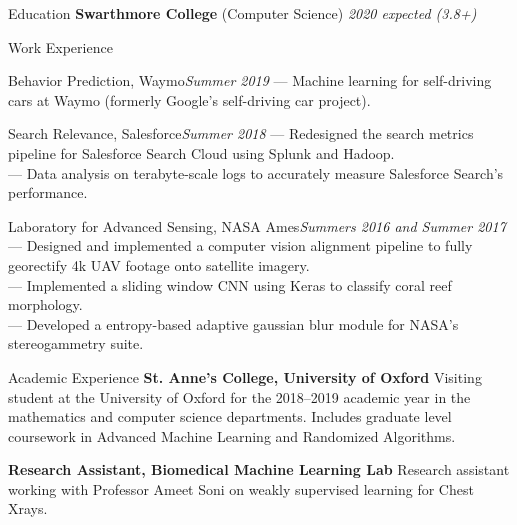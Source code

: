 \documentclass{resume} %
\begin{document}

\begin{rSection}{Education}
	{ \textbf{Swarthmore College} (Computer Science)} \hfill {\em 2020 expected (3.8+)} 
\end{rSection}

\begin{rSection}{Work Experience}
	{
		\begin{rSubsection}{Behavior Prediction,  Waymo}{\em Summer 2019}{}{}
			--- Machine learning for self-driving cars at Waymo (formerly Google's self-driving car project).
		\end{rSubsection}
	}
	{
		\begin{rSubsection}{Search Relevance, Salesforce}{\em Summer 2018}{}{}
			--- Redesigned the search metrics pipeline for Salesforce Search Cloud using Splunk and Hadoop. \\
			--- Data analysis on terabyte-scale logs to accurately measure Salesforce Search's performance.
		\end{rSubsection}
	
	}
	{
		\begin{rSubsection}{Laboratory for Advanced Sensing, NASA Ames}{\em Summers 2016 and Summer 2017}{}{}
			--- Designed and implemented a computer vision alignment pipeline to fully georectify 4k UAV footage onto satellite imagery. \\
			--- Implemented a sliding window CNN using Keras to classify coral reef morphology. \\
			--- Developed a entropy-based adaptive gaussian blur module for NASA's stereogammetry suite.
		\end{rSubsection}
	}

\end{rSection}  %

\begin{rSection}{Academic Experience}
	{\textbf{St. Anne's College, University of Oxford} Visiting student at the University of Oxford for the 2018--2019 academic year in the mathematics and computer science departments. Includes graduate level coursework in Advanced Machine Learning and Randomized Algorithms.}

	{\textbf{Research Assistant, Biomedical Machine Learning Lab} Research assistant working with Professor Ameet Soni on weakly supervised learning for Chest Xrays.}
\end{rSection}  %
\end{document}
